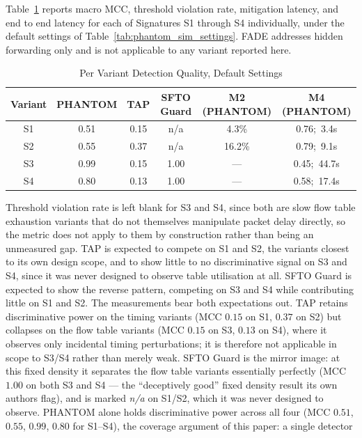 \documentclass[final,5p,twocolumn]{elsarticle}
\theoremstyle{remark}
\theoremstyle{plain}
\begin{document}
Table~\ref{tab:exp5_variant} reports macro MCC, threshold violation rate,
mitigation latency, and end to end latency for each of Signatures S1 through
S4 individually, under the default settings of
Table~\ref{tab:phantom_sim_settings}. FADE addresses hidden forwarding only
and is not applicable to any variant reported here.
\begin{table}[!t]
	\centering
	\caption{Per Variant Detection Quality, Default Settings}
	\label{tab:exp5_variant}
	\renewcommand{\arraystretch}{1.15}
	\footnotesize
	\begin{tabular}{|c|c|c|c|c|c|}
		\hline
		\textbf{Variant} & \textbf{PHANTOM} & \textbf{TAP} & \textbf{SFTO Guard} & \textbf{M2 (PHANTOM)} & \textbf{M4 (PHANTOM)} \\
		\hline
		S1 & 0.51 & 0.15 & n/a & 4.3\% & 0.76;\ 3.4s \\
		\hline
		S2 & 0.55 & 0.37 & n/a & 16.2\% & 0.79;\ 9.1s \\
		\hline
		S3 & 0.99 & 0.15 & 1.00 & --- & 0.45;\ 44.7s \\
		\hline
		S4 & 0.80 & 0.13 & 1.00 & --- & 0.58;\ 17.4s \\
		\hline
	\end{tabular}
\end{table}
Threshold violation rate is left blank for S3 and S4, since both are slow
flow table exhaustion variants that do not themselves manipulate packet
delay directly, so the metric does not apply to them by construction rather
than being an unmeasured gap. TAP is expected to compete on S1 and S2, the
variants closest to its own design scope, and to show little to no
discriminative signal on S3 and S4, since it was never designed to observe
table utilisation at all. SFTO Guard is expected to show the reverse
pattern, competing on S3 and S4 while contributing little on S1 and S2.
The measurements bear both expectations out. TAP retains discriminative
power on the timing variants (MCC $0.15$ on S1, $0.37$ on S2) but collapses
on the flow table variants (MCC $0.15$ on S3, $0.13$ on S4), where it
observes only incidental timing perturbations; it is therefore not
applicable in scope to S3/S4 rather than merely weak. SFTO Guard is the
mirror image: at this fixed density it separates the flow table variants
essentially perfectly (MCC $1.00$ on both S3 and S4 --- the ``deceptively
good'' fixed density result its own authors flag), and is marked
\emph{n/a} on S1/S2, which it was never designed to observe. PHANTOM alone
holds discriminative power across all four (MCC $0.51$, $0.55$, $0.99$,
$0.80$ for S1--S4), the coverage argument of this paper: a single detector
\end{document}
